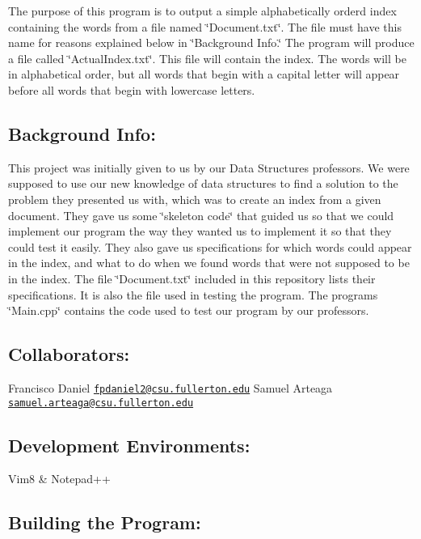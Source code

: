 The purpose of this program is to output a simple alphabetically orderd index containing the words from a file named \char`\"{}\+Document.\+txt\char`\"{}. The file must have this name for reasons explained below in \char`\"{}\+Background Info.\char`\"{} The program will produce a file called \char`\"{}\+Actual\+Index.\+txt\char`\"{}. This file will contain the index. The words will be in alphabetical order, but all words that begin with a capital letter will appear before all words that begin with lowercase letters.

\subsection*{Background Info\+:}

This project was initially given to us by our Data Structures professors. We were supposed to use our new knowledge of data structures to find a solution to the problem they presented us with, which was to create an index from a given document. They gave us some \char`\"{}skeleton code\char`\"{} that guided us so that we could implement our program the way they wanted us to implement it so that they could test it easily. They also gave us specifications for which words could appear in the index, and what to do when we found words that were not supposed to be in the index. The file \char`\"{}\+Document.\+txt\char`\"{} included in this repository lists their specifications. It is also the file used in testing the program. The program\textquotesingle{}s \char`\"{}\+Main.\+cpp\char`\"{} contains the code used to test our program by our professors.

\subsection*{Collaborators\+:}

Francisco Daniel \href{mailto:fpdaniel2@csu.fullerton.edu}{\tt fpdaniel2@csu.\+fullerton.\+edu} Samuel Arteaga \href{mailto:samuel.arteaga@csu.fullerton.edu}{\tt samuel.\+arteaga@csu.\+fullerton.\+edu}

\subsection*{Development Environments\+:}

Vim8 \& Notepad++

\subsection*{Building the Program\+:}

